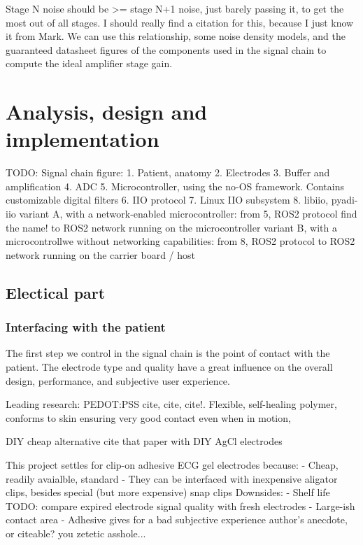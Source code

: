 \documentclass{thesis}
\begin{document}
Stage N noise should be >= stage N+1 noise, just barely passing it, to get the most out of all stages. I should really find a citation for this, because I just know it from Mark. We can use this relationship, some noise density models, and the guaranteed datasheet figures of the components used in the signal chain to compute the ideal amplifier stage gain.

\newpage
\section{Analysis, design and implementation}

TODO: Signal chain figure:
1. Patient, anatomy
2. Electrodes
3. Buffer and amplification
4. ADC
5. Microcontroller, using the no-OS framework. Contains customizable digital filters
6. IIO protocol
7. Linux IIO subsystem
8. libiio, pyadi-iio
variant A, with a network-enabled microcontroller:
from 5, ROS2 protocol {find the name!} to ROS2 network running on the microcontroller
variant B, with a microcontrollwe without networking capabilities:
from 8, ROS2 protocol to ROS2 network running on the carrier board / host

\newpage
\subsection{Electical part}

\subsubsection{Interfacing with the {patient}}

The first step we control in the signal chain is the point of contact with the patient. The electrode type and quality have a great influence on the overall design, performance, and subjective user experience.

Leading research: PEDOT:PSS {cite, cite, cite!}. Flexible, self-healing polymer, conforms to skin ensuring very good contact even when in motion, 

DIY cheap alternative {cite that paper with DIY AgCl electrodes}

This project settles for clip-on adhesive ECG gel electrodes because:
- Cheap, readily avaialble, standard
- They can be interfaced with inexpensive aligator clips, besides special (but more expensive) snap clips
Downsides:
- Shelf life {TODO: compare expired electrode signal quality with fresh electrodes}
- Large-ish contact area
- Adhesive gives for a bad subjective experience {author's anecdote, or citeable? you zetetic asshole...}
\end{document}
